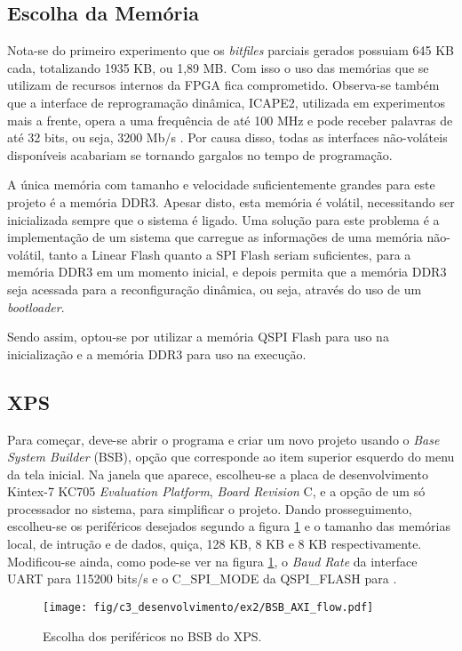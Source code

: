 \documentclass[11pt,a4paper,oneside]{book}
\begin{document}
\subsection{Escolha da Memória}
Nota-se do primeiro experimento que os \textit{bitfiles} parciais gerados possuiam 645 KB cada, totalizando 1935 KB, ou 1,89 MB.
Com isso o uso das memórias que se utilizam de recursos internos da FPGA fica comprometido.
Observa-se também que a interface de reprogramação dinâmica, ICAPE2, utilizada em experimentos mais a frente, opera a uma frequência de até 100 MHz e pode receber palavras de até 32 bits, ou seja, 3200 Mb/s \cite{ug702}.
Por causa disso, todas as interfaces não-voláteis disponíveis acabariam se tornando gargalos no tempo de programação.

A única memória com tamanho e velocidade suficientemente grandes para este projeto é a memória DDR3.
Apesar disto, esta memória é volátil, necessitando ser inicializada sempre que o sistema é ligado.
Uma solução para este problema é a implementação de um sistema que carregue as informações de uma memória não-volátil, tanto a Linear Flash quanto a SPI Flash seriam suficientes, para a memória DDR3 em um momento inicial, e depois permita que a memória DDR3 seja acessada para a reconfiguração dinâmica, ou seja, através do uso de um \textit{bootloader}.

Sendo assim, optou-se por utilizar a memória QSPI Flash para uso na inicialização e a memória DDR3 para uso na execução.

\subsection{XPS}
Para começar, deve-se abrir o programa e criar um novo projeto usando o \textit{Base System Builder} (BSB), opção que corresponde ao item superior esquerdo do menu da tela inicial.
Na janela que aparece, escolheu-se a placa de desenvolvimento Kintex-7 KC705 \textit{Evaluation Platform}, \textit{Board Revision} C, e a opção de um só processador no sistema, para simplificar o projeto.
Dando prosseguimento, escolheu-se os periféricos desejados segundo a figura \ref{fig:ex2:bsb_prerifericos} e o tamanho das memórias local, de intrução e de dados, quiça, 128 KB, 8 KB e 8 KB respectivamente.
Modificou-se ainda, como pode-se ver na figura \ref{fig:ex2:bsb_prerifericos}, o \textit{Baud Rate} da interface UART para 115200 bits/s e o C\_SPI\_MODE da QSPI\_FLASH para .

\begin{figure}[htp]
\centering
\texttt{[image: fig/c3\_desenvolvimento/ex2/BSB\_AXI\_flow.pdf]}
\caption{Escolha dos periféricos no BSB do XPS.}
\label{fig:ex2:bsb_prerifericos}
\end{figure}
\end{document}
